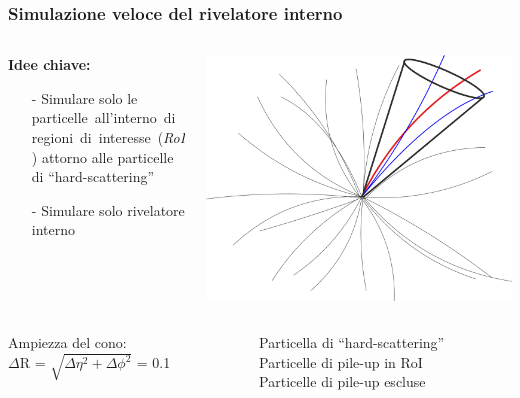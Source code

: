 \documentclass{beamer}
\begin{document}
\begin{frame}[t]
\frametitle{Simulazione veloce del rivelatore interno}

\begin{columns}
	\begin{column}{.45\textwidth}
	\begin{tcolorbox}{}
	\textbf{\color{dred} Idee chiave:}\\
	\begin{itemize}
	\item[\color{black}-]
	 \small Simulare solo le \\ 
	 \mbox{particelle all'interno di} \mbox{regioni di interesse (\textit{RoI})}
	 attorno alle particelle di ``hard-scattering''
	 \item[\color{black}-] Simulare solo rivelatore interno
	 \end{itemize}
	\end{tcolorbox}		
	
	\end{column}
	\begin{column}{.55\textwidth}
		\centering
		\includegraphics[width=.8\textwidth]{cone}
	\end{column}
\end{columns}

\begin{columns}
\begin{column}{.45\textwidth}
		\begin{block}{}
		Ampiezza del cono:\\
		$\Delta$R = $\sqrt{\Delta\eta^{2} + \Delta\phi^{2}}$ = 0.1
		\end{block}
\end{column}
\begin{column}{.55\textwidth}
		\begin{center}
		\small
		{\color{dred} Particella di ``hard-scattering''} \\
		\vskip0.2cm
		{\color{blue} Particelle di pile-up in RoI} \\
		\vskip0.2cm
		{\color{gray} Particelle di pile-up escluse} \\
		\vskip0.2cm
		\end{center}
\end{column}
\end{columns}
	
\end{frame}
\end{document}
